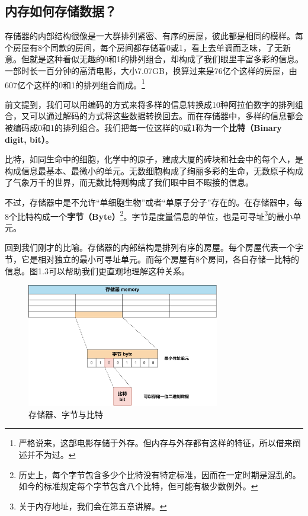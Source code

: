 \subsection*{内存如何存储数据？}
存储器的内部结构很像是一大群排列紧密、有序的房屋，彼此都是相同的模样。每个房屋有8个同款的房间，每个房间都存储着0或1，看上去单调而乏味，了无新意。但就是这种看似无趣的0和1的排列组合，却构成了我们眼里丰富多彩的信息。一部时长一百分钟的高清电影，大小7.07GB，换算过来是76亿个这样的房屋，由607亿个这样的0和1的排列组合而成。\footnote{严格说来，这部电影存储于外存。但内存与外存都有这样的特征，所以借来阐述并不为过。}\par
前文提到，我们可以用编码的方式来将多样的信息转换成10种阿拉伯数字的排列组合，又可以通过解码的方式将这些数据转换回去。而在存储器中，多样的信息都会被编码成0和1的排列组合。我们把每一位这样的0或1称为一个\textbf{比特（Binary digit, bit）}。\par
比特，如同生命中的细胞，化学中的原子，建成大厦的砖块和社会中的每个人，是构成信息最基本、最微小的单元。无数细胞构成了绚丽多彩的生命，无数原子构成了气象万千的世界，而无数比特则构成了我们眼中目不睱接的信息。\par
不过，存储器中是不允许``单细胞生物''或者``单原子分子''存在的。在存储器中，每8个比特构成一个\textbf{字节（Byte）}\footnote{历史上，每个字节包含多少个比特没有特定标准，因而在一定时期是混乱的。如今的标准规定每个字节包含八个比特，但可能有极少数例外。}。字节是度量信息的单位，也是可寻址\footnote{关于内存地址，我们会在第五章讲解。}的最小单元。\par
回到我们刚才的比喻。存储器的内部结构是排列有序的房屋。每个房屋代表一个字节，它是相对独立的最小可寻址单元。而每个房屋有8个房间，各自存储一比特的信息。图1.3可以帮助我们更直观地理解这种关系。\par
\begin{figure}[htbp]
    \centering
    \includegraphics[width=0.75\textwidth]{../images/generalized_parts/01_Memory_byte_and_bit_300.png}
    \caption{存储器、字节与比特}
\end{figure}
